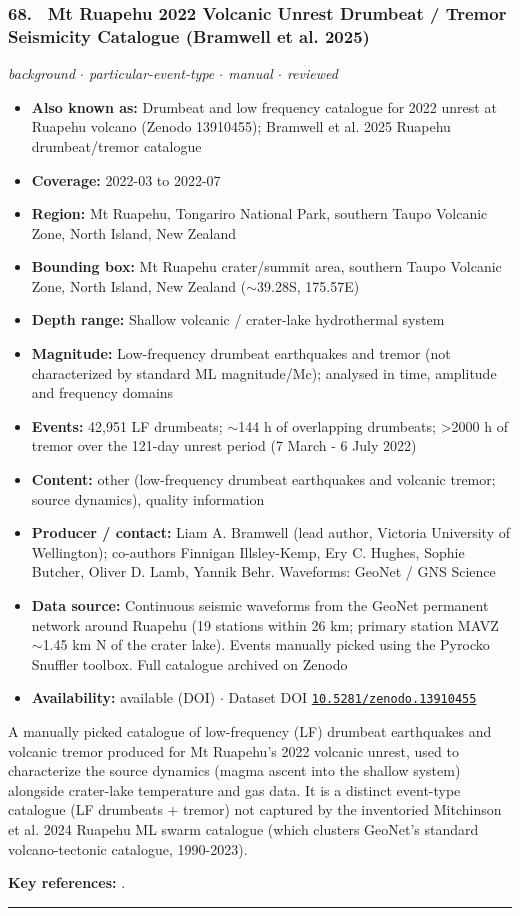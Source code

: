 \documentclass[10pt,a4paper]{article}
\newcommand{\catentryrule}{\par\vspace{3pt}\noindent\textcolor{rulegrey}{\rule{\linewidth}{0.3pt}}\par\vspace{5pt}}
\newcommand{\kv}[2]{\item \textbf{#1:} #2}
\begin{document}
\subsubsection*{\hypertarget{c:68}{68.}~ Mt Ruapehu 2022 Volcanic Unrest Drumbeat / Tremor Seismicity Catalogue (Bramwell et al. 2025)}
{\small\itshape background $\cdot$ particular-event-type $\cdot$ manual $\cdot$ reviewed}\par\vspace{2pt}
\begin{itemize}[leftmargin=1.3em,itemsep=0.6pt,topsep=1pt,parsep=0pt]
\kv{Also known as}{Drumbeat and low frequency catalogue for 2022 unrest at Ruapehu volcano (Zenodo 13910455); Bramwell et al. 2025 Ruapehu drumbeat/tremor catalogue}
\kv{Coverage}{2022-03 to 2022-07}
\kv{Region}{Mt Ruapehu, Tongariro National Park, southern Taupo Volcanic Zone, North Island, New Zealand}
\kv{Bounding box}{Mt Ruapehu crater/summit area, southern Taupo Volcanic Zone, North Island, New Zealand ($\sim$39.28S, 175.57E)}
\kv{Depth range}{Shallow volcanic / crater-lake hydrothermal system}
\kv{Magnitude}{Low-frequency drumbeat earthquakes and tremor (not characterized by standard ML magnitude/Mc); analysed in time, amplitude and frequency domains}
\kv{Events}{42,951 LF drumbeats; $\sim$144 h of overlapping drumbeats; \textgreater{}2000 h of tremor over the 121-day unrest period (7 March - 6 July 2022)}
\kv{Content}{other (low-frequency drumbeat earthquakes and volcanic tremor; source dynamics), quality information}
\kv{Producer / contact}{Liam A. Bramwell (lead author, Victoria University of Wellington); co-authors Finnigan Illsley-Kemp, Ery C. Hughes, Sophie Butcher, Oliver D. Lamb, Yannik Behr. Waveforms: GeoNet / GNS Science}
\kv{Data source}{Continuous seismic waveforms from the GeoNet permanent network around Ruapehu (19 stations within 26 km; primary station MAVZ $\sim$1.45 km N of the crater lake). Events manually picked using the Pyrocko Snuffler toolbox. Full catalogue archived on Zenodo}
\kv{Availability}{available (DOI) $\cdot$ Dataset DOI \href{https://doi.org/10.5281/zenodo.13910455}{\nolinkurl{10.5281/zenodo.13910455}}}
\end{itemize}
\par\vspace{2pt}A manually picked catalogue of low-frequency (LF) drumbeat earthquakes and volcanic tremor produced for Mt Ruapehu's 2022 volcanic unrest, used to characterize the source dynamics (magma ascent into the shallow system) alongside crater-lake temperature and gas data. It is a distinct event-type catalogue (LF drumbeats + tremor) not captured by the inventoried Mitchinson et al. 2024 Ruapehu ML swarm catalogue (which clusters GeoNet's standard volcano-tectonic catalogue, 1990-2023).
\par\vspace{2pt}\textbf{Key references:} \cite{Bramwell2025,Bramwell2024}.
\catentryrule
\end{document}
